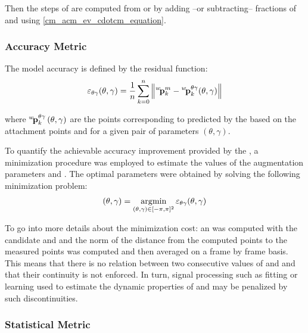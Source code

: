 Then the steps of  are computed from  or  by adding --or
subtracting-- fractions of \catL{} and using \cref{cm_acm_ev_cdotcm_equation}.

\subsubsection{Accuracy Metric}
\label{cm_acm_ev_accuracy_metric}

The model accuracy is defined by the residual function:
\begin{align}
	\res{\theta\gamma}(\theta, \gamma) = \frac{1}{n} \sum_{k=0}^{n} \norm{\fllpoint{p}{w}{m}{k} - \fllpoint{p}{w}{\theta\gamma}{k}(\theta, \gamma)}
	\label{cm_acm_ev_am_residual}
\end{align}

where $\fllpoint{p}{w}{\theta\gamma}{k}\left(\theta, \gamma\right)$ are the points corresponding to
 predicted by the \thetagammamodel{} based on the attachment points
 and  for a given pair of parameters $\left(\theta,
	\gamma\right)$.

To quantify the achievable accuracy improvement provided by the \thetagammamodel{}, a minimization
procedure was employed to estimate the values of the augmentation parameters \scal{\theta} and
\scal{\gamma}. The optimal parameters were obtained by solving the following minimization problem:
\begin{align}
	(\theta, \gamma) = \operatorname*{arg\!\min}_{(\theta, \gamma) \in [-\pi, \pi]^2} \varepsilon_{\theta\gamma}(\theta, \gamma)
	\label{cm_acm_ev_am_minimization}
\end{align}

To go into more details about the minimization cost: an \augmentedmodel{} was computed with the
candidate \scal{\theta} and \scal{\gamma} and the norm of the distance from the computed points
 to the measured points  was computed and then
averaged on a frame by frame basis. This means that there is no relation between two consecutive
values of \scal{\theta} and \scal{\gamma} and that their continuity is not enforced. In turn,
signal processing such as fitting or learning used to estimate the dynamic properties of
\scal{\theta} and \scal{\gamma} may be penalized by such discontinuities.

\subsubsection{Statistical Metric}
\label{cm_acm_ev_statistical_metric}

